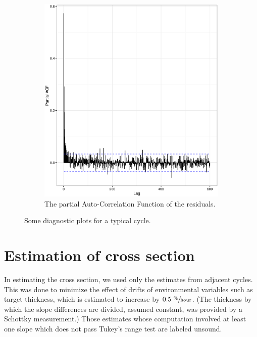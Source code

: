 \documentclass[reprint]{revtex4-1}
\newcommand{\scl}{.4}
\begin{document}
\begin{figure}
\begin{subfigure}{.5\textwidth}
\includegraphics[scale=\scl]{img/Run969_residual_PACF.eps}
\caption{The partial Auto-Correlation Function of the residuals.}
\end{subfigure}
\caption{Some diagnostic plots for a typical cycle.\label{fig:Run969}}
\end{figure}

\section{Estimation of cross section}
In estimating the cross section, we used only the estimates from adjacent cycles. This was done to minimize the effect of drifts of environmental variables such as target thickness, which is estimated to increase by $0.5~ \sfrac{\%}{\mathrm{hour}}$. (The thickness by which the slope differences are divided, assumed constant, was provided by a Schottky measurement.) Those estimates whose computation involved at least one slope which does not pass Tukey's range test are labeled unsound.
\end{document}
